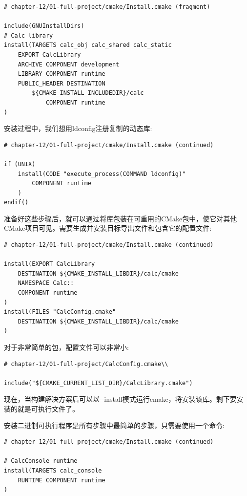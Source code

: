 \begin{lstlisting}[style=styleCMake]
# chapter-12/01-full-project/cmake/Install.cmake (fragment)

include(GNUInstallDirs)
# Calc library
install(TARGETS calc_obj calc_shared calc_static
	EXPORT CalcLibrary
	ARCHIVE COMPONENT development
	LIBRARY COMPONENT runtime
	PUBLIC_HEADER DESTINATION
		${CMAKE_INSTALL_INCLUDEDIR}/calc
			COMPONENT runtime
)
\end{lstlisting}

安装过程中，我们想用ldconfig注册复制的动态库:

\begin{lstlisting}[style=styleCMake]
# chapter-12/01-full-project/cmake/Install.cmake (continued)

if (UNIX)
	install(CODE "execute_process(COMMAND ldconfig)"
		COMPONENT runtime
	)
endif()
\end{lstlisting}

准备好这些步骤后，就可以通过将库包装在可重用的CMake包中，使它对其他CMake项目可见。需要生成并安装目标导出文件和包含它的配置文件:

\begin{lstlisting}[style=styleCMake]
# chapter-12/01-full-project/cmake/Install.cmake (continued)

install(EXPORT CalcLibrary
	DESTINATION ${CMAKE_INSTALL_LIBDIR}/calc/cmake
	NAMESPACE Calc::
	COMPONENT runtime
)
install(FILES "CalcConfig.cmake"
	DESTINATION ${CMAKE_INSTALL_LIBDIR}/calc/cmake
)
\end{lstlisting}

对于非常简单的包，配置文件可以非常小:

\begin{lstlisting}[style=styleCMake]
# chapter-12/01-full-project/CalcConfig.cmake\\

include("${CMAKE_CURRENT_LIST_DIR}/CalcLibrary.cmake")
\end{lstlisting}

现在，当构建解决方案后可以以-{}-install模式运行cmake，将安装该库。剩下要安装的就是可执行文件了。


安装二进制可执行程序是所有步骤中最简单的步骤，只需要使用一个命令:

\begin{lstlisting}[style=styleCMake]
# chapter-12/01-full-project/cmake/Install.cmake (continued)

# CalcConsole runtime
install(TARGETS calc_console
	RUNTIME COMPONENT runtime
)
\end{lstlisting}

